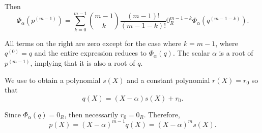 \begin{defproof}
  Then
  \begin{equation*}
    \Phi_\alpha(p^{(m-1)}) = \sum_{k=0}^{m-1} \binom {m-1} k \frac {(m - 1)!} {(m - 1 - k)!} 0_R^{m - 1 - k} \Phi_\alpha(q^{(m - 1 - k)}).
  \end{equation*}

  All terms on the right are zero except for the case where \( k = m - 1 \), where \( q^{(0)} = q \) and the entire expression reduces to \( \Phi_\alpha(q) \). The scalar \( \alpha \) is a root of \( p^{(m-1)} \), implying that it is also a root of \( q \).

  We use  to obtain a polynomial \( s(X) \) and a constant polynomial \( r(X) = r_0 \) so that
  \begin{equation*}
    q(X) = (X - \alpha) s(X) + r_0.
  \end{equation*}

  Since \( \Phi_\alpha(q) = 0_R \), then necessarily \( r_0 = 0_R \). Therefore,
  \begin{equation*}
    p(X) = (X - \alpha)^{m-1} q(X) = (X - \alpha)^m s(X).
  \end{equation*}
\end{defproof}
